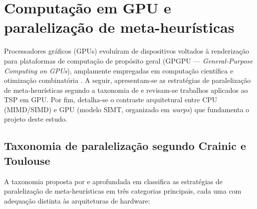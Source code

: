 \section{Computação em GPU e paralelização de meta-heurísticas}\label{sec-26-gpu-metaheuristicas}

Processadores gráficos (GPUs) evoluíram de dispositivos voltados à renderização para plataformas de computação de propósito geral (GPGPU --- \emph{General-Purpose Computing on GPUs}), amplamente empregadas em computação científica e otimização combinatória \autocite{nvidia2024cuda}.
A seguir, apresentam-se as estratégias de paralelização de meta-heurísticas segundo a taxonomia de \textcite{crainic2003parallel,crainic2010parallel} e revisam-se trabalhos aplicados ao TSP em GPU.
Por fim, detalha-se o contraste arquitetural entre CPU (MIMD/SIMD) e GPU (modelo SIMT, organizado em \emph{warps}) que fundamenta o projeto deste estudo.

\subsection{Taxonomia de paralelização segundo Crainic e Toulouse}\label{sec-261-taxonomia-paralelizacao}

A taxonomia proposta por \textcite{crainic2003parallel} e aprofundada em \textcite{crainic2010parallel} classifica as estratégias de paralelização de meta-heurísticas em três categorias principais, cada uma com adequação distinta às arquiteturas de hardware:

